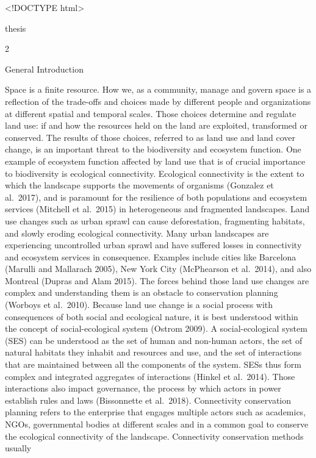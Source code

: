 \documentclass[]{article}
\author{}
\date{\vspace{-2.5em}}
\begin{document}
\textless{}!DOCTYPE html\textgreater{}

thesis

{2}

{General Introduction}

Space is a finite resource. How we, as a community, manage and govern
space is a reflection of the trade-offs and choices made by different
people and organizations at different spatial and temporal scales. Those
choices determine and regulate land use: if and how the resources held
on the land are exploited, transformed or conserved. The results of
those choices, referred to as land use and land cover change, is an
important threat to the biodiversity and ecosystem function. One example
of ecosystem function affected by land use that is of crucial importance
to biodiversity is ecological connectivity. Ecological connectivity is
the extent to which the landscape supports the movements of organisms
(Gonzalez et al.~2017), and is paramount for the resilience of both
populations and ecosystem services (Mitchell et al.~2015) in
heterogeneous and fragmented landscapes. Land use changes such as urban
sprawl can cause deforestation, fragmenting habitats, and slowly eroding
ecological connectivity. Many urban landscapes are experiencing
uncontrolled urban sprawl and have suffered losses in connectivity and
ecosystem services in consequence. Examples include cities like
Barcelona (Marulli and Mallarach 2005), New York City (McPhearson et
al.~2014), and also Montreal (Dupras and Alam 2015). The forces behind
those land use changes are complex and understanding them is an obstacle
to conservation planning (Worboys et al.~2010). Because land use change
is a social process with consequences of both social and ecological
nature, it is best understood within the concept of social-ecological
system (Ostrom 2009). A social-ecological system (SES) can be understood
as the set of human and non-human actors, the set of natural habitats
they inhabit and resources and use, and the set of interactions that are
maintained between all the components of the system. SESs thus form
complex and integrated aggregates of interactions (Hinkel et al.~2014).
Those interactions also impact governance, the process by which actors
in power establish rules and laws (Bissonnette et al.~2018).
Connectivity conservation planning refers to the enterprise that engages
multiple actors such as academics, NGOs, governmental bodies at
different scales and in a common goal to conserve the ecological
connectivity of the landscape. Connectivity conservation methods usually
\end{document}
